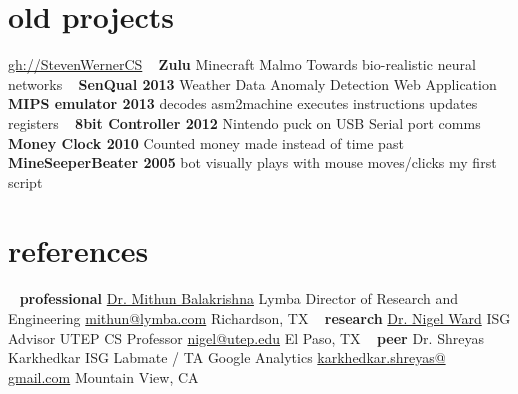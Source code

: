 \documentclass[]{friggeri-cv} %
\begin{document}
\begin{aside2}
\section{old projects}
\href{http://www.github.com/StevenWernerCS/}{gh://StevenWernerCS}
~
\textbf{Zulu}
Minecraft Malmo
Towards bio-realistic neural networks
~
\textbf{SenQual 2013}
Weather Data
Anomaly Detection
Web Application
~
\textbf{MIPS emulator 2013}
decodes asm2machine
executes instructions
updates registers
~
\textbf{8bit Controller 2012}
Nintendo puck on USB
Serial port comms
~
\textbf{Money Clock 2010}
Counted money made
instead of time past
~
\textbf{MineSeeperBeater 2005}
bot visually plays with
mouse moves/clicks
my first script
~
\section{references}
~
\textbf{professional}
\href{https://www.linkedin.com/in/mithun-balakrishna-9823b94/}{Dr. Mithun Balakrishna}
Lymba Director of Research and Engineering
\href{mailto:mithun@lymba.com}{mithun@lymba.com}
Richardson, TX
~
\textbf{research}
\href{http://www.cs.utep.edu/nigel/}{Dr. Nigel Ward}
ISG Advisor
UTEP CS Professor
\href{mailto:nigel@utep.edu}{nigel@utep.edu}
El Paso, TX
~
\textbf{peer}
Dr. Shreyas Karkhedkar
ISG Labmate / TA
Google Analytics
\href{mailto:karkhedkar.shreyas@gmail.com}{karkhedkar.shreyas@
gmail.com}
Mountain View, CA
\end{aside2}

\end{document}
